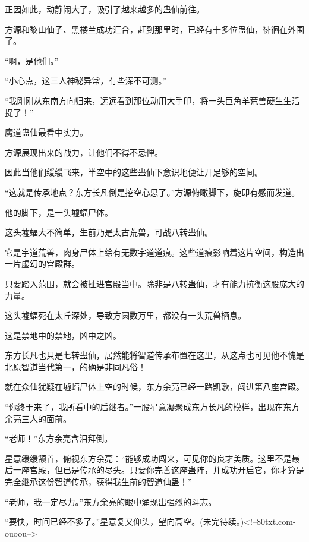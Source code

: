 \begin{this_body}
正因如此，动静闹大了，吸引了越来越多的蛊仙前往。

方源和黎山仙子、黑楼兰成功汇合，赶到那里时，已经有十多位蛊仙，徘徊在外围了。

“啊，是他们。”

“小心点，这三人神秘异常，有些深不可测。”

“我刚刚从东南方向归来，远远看到那位动用大手印，将一头巨角羊荒兽硬生生活捉了！”

魔道蛊仙最看中实力。

方源展现出来的战力，让他们不得不忌惮。

因此当他们缓缓飞来，半空中的这些蛊仙下意识地便让开足够的空间。

“这就是传承地点？东方长凡倒是挖空心思了。”方源俯瞰脚下，旋即有感而发道。

他的脚下，是一头墟蝠尸体。

这头墟蝠大不简单，生前乃是太古荒兽，可战八转蛊仙。

它是宇道荒兽，肉身尸体上绘有无数宇道道痕。这些道痕影响着这片空间，构造出一片虚幻的宫殿群。

只要踏入范围，就会被扯进宫殿当中。除非是八转蛊仙，才有能力抗衡这股庞大的力量。

这头墟蝠死在太丘深处，导致方圆数万里，都没有一头荒兽栖息。

这是禁地中的禁地，凶中之凶。

东方长凡也只是七转蛊仙，居然能将智道传承布置在这里，从这点也可见他不愧是北原智道当代第一，的确是非同凡俗！

就在众仙犹疑在墟蝠尸体上空的时候，东方余亮已经一路凯歌，闯进第八座宫殿。

“你终于来了，我所看中的后继者。”一股星意凝聚成东方长凡的模样，出现在东方余亮三人的面前。

“老师！”东方余亮含泪拜倒。

星意缓缓颔首，俯视东方余亮：“能够成功闯来，可见你的良才美质。这里不是最后一座宫殿，但已是传承的尽头。只要你完善这座蛊阵，并成功开启它，你才算是完全继承这份智道传承，获得我生前的智道仙蛊！”

“老师，我一定尽力。”东方余亮的眼中涌现出强烈的斗志。

“要快，时间已经不多了。”星意复又仰头，望向高空。(未完待续。)<!--80txt.com-ouoou-->

\end{this_body}

